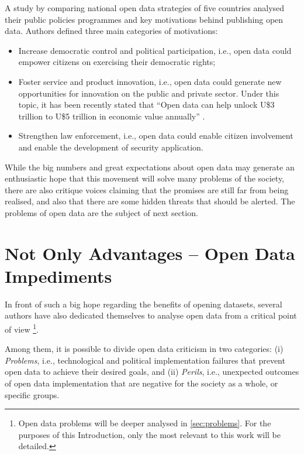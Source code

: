 {A study by  comparing national open data strategies of five countries analysed their public policies programmes and key motivations behind publishing open data.
Authors defined three main categories of motivations:
\begin{itemize}
	\item Increase democratic control and political participation, i.e., open data could empower citizens on exercising their democratic rights;
	\item Foster service and product innovation, i.e., open data could generate new opportunities for innovation on the public and private sector. Under this topic, it has been recently stated that “Open data can help unlock U\$3 trillion to U\$5 trillion in economic value annually” \cite{Manyika2013}.
	\item Strengthen law enforcement, i.e., open data could enable citizen involvement and enable the development of security application.
\end{itemize}

While the big numbers and great expectations about open data may generate an enthusiastic hope that this movement will solve many problems of the society, there are also critique voices claiming that the promises are still far from being realised, and also that there are some hidden threats that should be alerted.
The problems of open data are the subject of next section.

\section{Not Only Advantages -- Open Data Impediments}

In front of such a big hope regarding the benefits of opening datasets, several authors have also dedicated themselves to analyse open data from a critical point of view \cite{Zuiderwijk2012, Zuiderwijk2014, Gurstein2011, Bates2014, Roseira2016, Parycek2016, Davies2012b}
\footnote{Open data problems will be deeper analysed in \autoref{sec:problems}.
For the purposes of this Introduction, only the most relevant to this work will be detailed.}.

Among them, it is possible to divide open data criticism in two categories: (i) \emph{Problems}, i.e., technological and political implementation failures that prevent open data to achieve their desired goals, and (ii) \emph{Perils}, i.e., unexpected outcomes of open data implementation that are negative for the society as a whole, or specific groups.

}
